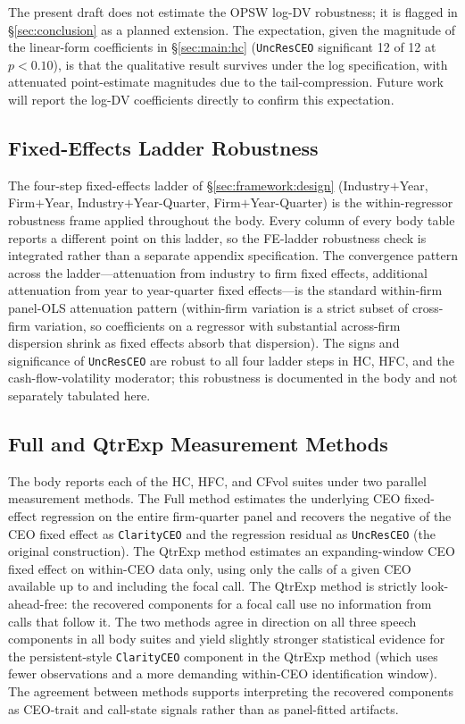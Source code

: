 The present draft does not estimate the OPSW log-DV robustness; it is flagged in \S\ref{sec:conclusion} as a planned extension. The expectation, given the magnitude of the linear-form coefficients in \S\ref{sec:main:hc} (\texttt{UncResCEO} significant 12 of 12 at $p<0.10$), is that the qualitative result survives under the log specification, with attenuated point-estimate magnitudes due to the tail-compression. Future work will report the log-DV coefficients directly to confirm this expectation.

\subsection{Fixed-Effects Ladder Robustness}
\label{app:robustness:fe}

The four-step fixed-effects ladder of \S\ref{sec:framework:design} (Industry$+$Year, Firm$+$Year, Industry$+$Year-Quarter, Firm$+$Year-Quarter) is the within-regressor robustness frame applied throughout the body. Every column of every body table reports a different point on this ladder, so the FE-ladder robustness check is integrated rather than a separate appendix specification. The convergence pattern across the ladder---attenuation from industry to firm fixed effects, additional attenuation from year to year-quarter fixed effects---is the standard within-firm panel-OLS attenuation pattern (within-firm variation is a strict subset of cross-firm variation, so coefficients on a regressor with substantial across-firm dispersion shrink as fixed effects absorb that dispersion). The signs and significance of \texttt{UncResCEO} are robust to all four ladder steps in HC, HFC, and the cash-flow-volatility moderator; this robustness is documented in the body and not separately tabulated here.

\subsection{Full and QtrExp Measurement Methods}
\label{app:robustness:methods}

The body reports each of the HC, HFC, and CFvol suites under two parallel measurement methods. The Full method estimates the underlying CEO fixed-effect regression on the entire firm-quarter panel and recovers the negative of the CEO fixed effect as \texttt{ClarityCEO} and the regression residual as \texttt{UncResCEO} (the original  construction). The QtrExp method estimates an expanding-window CEO fixed effect on within-CEO data only, using only the calls of a given CEO available up to and including the focal call. The QtrExp method is strictly look-ahead-free: the recovered components for a focal call use no information from calls that follow it. The two methods agree in direction on all three speech components in all body suites and yield slightly stronger statistical evidence for the persistent-style \texttt{ClarityCEO} component in the QtrExp method (which uses fewer observations and a more demanding within-CEO identification window). The agreement between methods supports interpreting the recovered components as CEO-trait and call-state signals rather than as panel-fitted artifacts.
